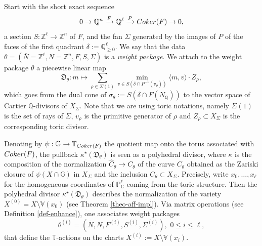 \documentclass[11pt, reqno]{amsart}
\theoremstyle{plain}
\theoremstyle{definition}
\theoremstyle{remark}
\begin{document}
Start with the short exact sequence
$$0\rightarrow \mathbb{Q}^{n}\xrightarrow{F} \mathbb{Q}^{\ell}\xrightarrow{P} {\rm Coker}(F)\rightarrow 0,$$
a section $S: \mathbb{Z}^{\ell} \rightarrow \mathbb{Z}^{n}$ of $F$, and the fan $\Sigma$ 
generated by the images of $P$ of the faces of the first quadrant $\delta:= \mathbb{Q}_{\geq 0}^{\ell}$. We say that the data $\theta =  (\overline{N} = \mathbb{Z}^{\ell}, N = \mathbb{Z}^{n}, F, S, \Sigma)$ is a \emph{weight package}. We attach to the weight package $\theta$ a piecewise linear map
$$\mathfrak{D}_{\theta}:  m \mapsto \sum_{\rho\in \Sigma(1)}\min_{v\in S(\delta \cap P^{-1}(v_{\rho}))}\langle m , v\rangle \cdot Z_{\rho},$$
which goes from the dual  cone of $\sigma_{\theta}:=  S(\delta\cap F(N_{\mathbb{Q}}))$ to the vector space of Cartier $\mathbb{Q}$-divisors of $X_{\Sigma}$. Note that we are  using toric notations, namely $\Sigma(1)$ is the set of rays of $\Sigma$, $v_{\rho}$ is the primitive generator of $\rho$ and $Z_{\rho}\subset X_{\Sigma}$ is the corresponding toric divisor.

 Denoting by $\psi: \mathbb{G}\rightarrow \mathbb{T}_{{\rm Coker}(F)}$ the quotient map onto the torus associated with ${\rm Coker}(F)$,  the pullback $\kappa^{\star}(\mathfrak{D}_{\theta})$ is seen as a polyhedral divisor, where $\kappa$ is the composition of the normalization $\widehat{C}_{\theta}\rightarrow C_{\theta}$ of the curve $C_{\theta}$ obtained as the Zariski closure of $\psi(X\cap \mathbb{G})$ in $X_{\Sigma}$ and the inclusion $C_{\theta}\subset X_{\Sigma}$. Precisely, write $x_{0}, \ldots, x_{\ell}$ for the homogeneous coordinates of $\mathbb{P}_{\mathbb{C}}^{\ell}$ coming from the toric structure. Then
the polyhedral divisor $\kappa^{\star}(\mathfrak{D}_{\theta})$ describes the normalization of the variety $X^{(0)} =  X\setminus \mathbb{V}(x_{0})$
(see Theorem \ref{theo-aff-impl}). Via matrix operations (see Definition \ref{def-enhance}), one associates weight packages $$\theta^{(i)} =   (\overline{N}, N, F^{(i)}, S^{(i)}, \Sigma^{(i)}), \,\,0\leq i\leq \ell,$$ that define the $\mathbb{T}$-actions on the charts  $X^{(i)}:= X\setminus \mathbb{V}(x_{i})$.  
\end{document}
